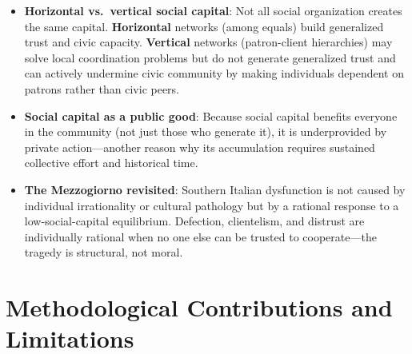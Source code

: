 \documentclass[12pt]{article}
\begin{document}
\begin{itemize}[leftmargin=*, itemsep=4pt]
    \item \textbf{Horizontal vs.\ vertical social capital}: Not all social organization creates the same capital. \textbf{Horizontal} networks (among equals) build generalized trust and civic capacity. \textbf{Vertical} networks (patron-client hierarchies) may solve local coordination problems but do not generate generalized trust and can actively undermine civic community by making individuals dependent on patrons rather than civic peers.
    \item \textbf{Social capital as a public good}: Because social capital benefits everyone in the community (not just those who generate it), it is underprovided by private action---another reason why its accumulation requires sustained collective effort and historical time.
    \item \textbf{The Mezzogiorno revisited}: Southern Italian dysfunction is not caused by individual irrationality or cultural pathology but by a rational response to a low-social-capital equilibrium. Defection, clientelism, and distrust are individually rational when no one else can be trusted to cooperate---the tragedy is structural, not moral.
\end{itemize}

\section{Methodological Contributions and Limitations}
\end{document}
